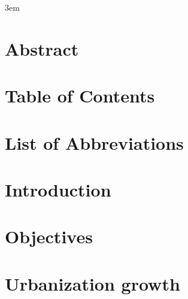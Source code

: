\documentclass[10pt,twoside]{book}
\begin{document}
\emergencystretch 3em

\frontmatter




\chapter{Abstract}
% 
\clearpage

\chapter{Table of Contents}
\tableofcontents %
\clearpage



\chapter{List of Abbreviations}

\clearpage

\mainmatter

\chapter{Introduction}
\clearpage


\clearpage

\chapter{Objectives}
\clearpage

% 
\clearpage

\chapter{Urbanization growth}
\clearpage
\end{document}
